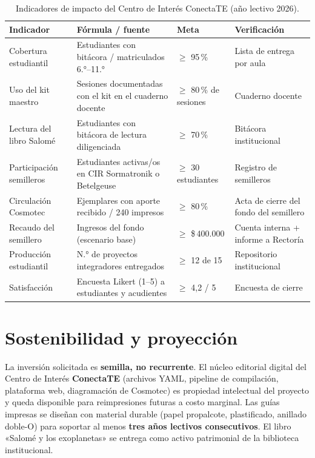 \documentclass[12pt, letterpaper]{article}
\newcommand{\pesos}[1]{\$\,#1}
\newcommand{\conectate}{\textbf{ConectaTE}}
\begin{document}
\renewcommand{\arraystretch}{1.30}
\begin{table}[H]
\centering
\small
\begin{tabularx}{\linewidth}{L{4.6cm} L{4.0cm} C{2.0cm} X}
\toprule
{}
\textbf{Indicador} & \textbf{Fórmula / fuente} & \textbf{Meta} & \textbf{Verificación} \\
\midrule
Cobertura estudiantil   & Estudiantes con bitácora / matriculados 6.°{}–11.°{} & $\geq$ 95\,\% & Lista de entrega por aula \\
Uso del kit maestro     & Sesiones documentadas con el kit en el cuaderno docente & $\geq$ 80\,\% de sesiones & Cuaderno docente \\
Lectura del libro Salomé & Estudiantes con bitácora de lectura diligenciada & $\geq$ 70\,\% & Bitácora institucional \\
Participación semilleros & Estudiantes activas/os en CIR Sormatronik o Betelgeuse & $\geq$ 30 estudiantes & Registro de semilleros \\
Circulación Cosmotec & Ejemplares con aporte recibido / 240 impresos & $\geq$ 80\,\% & Acta de cierre del fondo del semillero \\
Recaudo del semillero & Ingresos del fondo (escenario base) & $\geq$ \pesos{400.000} & Cuenta interna + informe a Rectoría \\
Producción estudiantil  & N.°{} de proyectos integradores entregados & $\geq$ 12 de 15 & Repositorio institucional \\
Satisfacción            & Encuesta Likert (1–5) a estudiantes y acudientes & $\geq$ 4{,}2 / 5 & Encuesta de cierre \\
\bottomrule
\end{tabularx}
\caption{Indicadores de impacto del Centro de Interés ConectaTE (año lectivo 2026).}
\end{table}

\section{Sostenibilidad y proyección}

La inversión solicitada es \textbf{semilla, no recurrente}. El núcleo editorial digital del Centro de Interés \conectate{} (archivos YAML, pipeline de compilación, plataforma web, diagramación de Cosmotec) es propiedad intelectual del proyecto y queda disponible para reimpresiones futuras a costo marginal. Las guías impresas se diseñan con material durable (papel propalcote, plastificado, anillado doble-O) para soportar al menos \textbf{tres años lectivos consecutivos}. El libro «Salomé y los exoplanetas» se entrega como activo patrimonial de la biblioteca institucional.
\end{document}
